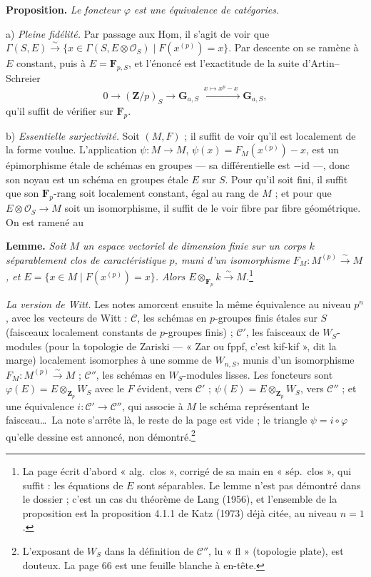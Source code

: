 \documentclass[11pt,a4paper]{article}
\begin{document}
\textbf{Proposition.} \emph{Le foncteur $\varphi$ est une équivalence de
catégories.}

a) \emph{Pleine fidélité.} Par passage aux $\underline{\mathrm{Hom}}$, il
s'agit de voir que
$\Gamma(S, E) \xrightarrow{\sim} \{x \in \Gamma(S, E \otimes \mathcal{O}_S) \mid
F(x^{(p)}) = x\}$. Par descente on se ramène à $E$ constant, puis à
$E = \mathbf{F}_{p,S}$, et l'énoncé est l'exactitude de la suite
d'Artin--Schreier
\[
  0 \longrightarrow (\mathbf{Z}/p)_S \longrightarrow \mathbf{G}_{a,S}
  \xrightarrow{\;x \mapsto x^p - x\;} \mathbf{G}_{a,S} ,
\]
qu'il suffit de vérifier sur $\mathbf{F}_p$.

b) \emph{Essentielle surjectivité.} Soit $(M, F)$ ; il suffit de voir qu'il est
localement de la forme voulue. L'application
$\psi : M \to M$, $\psi(x) = F_M(x^{(p)}) - x$, est un épimorphisme étale de
schémas en groupes — sa différentielle est $-\mathrm{id}$ —, donc son noyau est
un schéma en groupes étale $E$ sur $S$. Pour qu'il soit fini, il suffit que son
$\mathbf{F}_p$-rang soit localement constant, égal au rang de $M$ ; et pour que
$E \otimes \mathcal{O}_S \to M$ soit un isomorphisme, il suffit de le voir fibre
par fibre géométrique. On est ramené au

\textbf{Lemme.} \emph{Soit $M$ un espace vectoriel de dimension finie sur un
corps $k$ séparablement clos de caractéristique $p$, muni d'un isomorphisme
$F_M : M^{(p)} \xrightarrow{\sim} M$, et
$E = \{x \in M \mid F(x^{(p)}) = x\}$. Alors
$E \otimes_{\mathbf{F}_p} k \xrightarrow{\sim} M$.}\footnote{La page écrit
d'abord « alg.\ clos », corrigé de sa main en « sép.\ clos », qui suffit : les
équations de $E$ sont séparables. Le lemme n'est pas démontré dans le
dossier ; c'est un cas du théorème de Lang (1956), et l'ensemble de la
proposition est la proposition 4.1.1 de Katz (1973) déjà citée, au niveau
$n = 1$.}

\emph{La version de Witt.} Les notes amorcent ensuite la même équivalence au
niveau $p^n$, avec les vecteurs de Witt : $\mathcal{C}$, les schémas en
$p$-groupes finis étales sur $S$ (faisceaux localement constants de $p$-groupes
finis) ; $\mathcal{C}'$, les faisceaux de $W_S$-modules (pour la topologie de
Zariski — « Zar ou fppf, c'est kif-kif », dit la marge) localement isomorphes à
une somme de $W_{n,S}$, munis d'un isomorphisme $F_M : M^{(p)} \xrightarrow{\sim}
M$ ; $\mathcal{C}''$, les schémas en $W_S$-modules lisses. Les foncteurs sont
$\varphi(E) = E \otimes_{\mathbf{Z}_p} W_S$ avec le $F$ évident, vers
$\mathcal{C}'$ ; $\psi(E) = E \otimes_{\mathbf{Z}_p} W_S$, vers $\mathcal{C}''$ ;
et une équivalence $i : \mathcal{C}' \to \mathcal{C}''$, qui associe à $M$ le
schéma représentant le faisceau\ldots\ La note s'arrête là, le reste de la page
est vide ; le triangle $\psi = i \circ \varphi$ qu'elle dessine est
annoncé, non démontré.\footnote{L'exposant de $W_S$ dans la définition de
$\mathcal{C}''$, lu « fl » (topologie plate), est douteux. La page 66 est une
feuille blanche à en-tête.}
\end{document}
